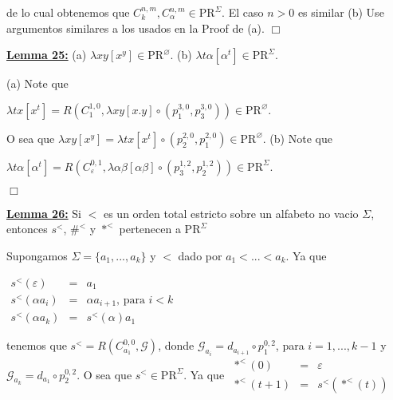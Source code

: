   de lo cual obtenemos que \(C_{k}^{n,m},C_{\alpha }^{n,m}\in \mathrm{PR} ^{\Sigma }\). El caso \(n >0\) es similar
  (b) Use argumentos similares a los usados en la Proof de (a). \(\Box\)


  \textbf{\underline{Lemma 25:}}
  (a) \(\lambda xy\left[ x^{y}\right] \in \mathrm{PR}^{\varnothing }\).
  (b) \(\lambda t\alpha \left[ \alpha ^{t}\right] \in \mathrm{PR} ^{\Sigma }\).


  \PROOF (a) Note que

  \(\displaystyle \lambda tx\left[ x^{t}\right] =R\left( C_{1}^{1,0},\lambda xy\left[ x.y \right] \circ \left( p_{1}^{3,0},p_{3}^{3,0}\right) \right) \in \mathrm{PR} ^{\varnothing }. \)

  O sea que \(\lambda xy\left[ x^{y}\right] =\lambda tx\left[ x^{t}\right] \circ \left( p_{2}^{2,0},p_{1}^{2,0}\right) \in \mathrm{PR}^{\varnothing }\).
  (b) Note que

  \(\displaystyle \lambda t\alpha \left[ \alpha ^{t}\right] =R\left( C_{\varepsilon }^{0,1},\lambda \alpha \beta \left[ \alpha \beta \right] \circ \left( p_{3}^{1,2},p_{2}^{1,2}\right) \right) \in \mathrm{PR}^{\Sigma }. \)

  \(\Box\)


  \textbf{\underline{Lemma 26:}} Si \(< \) es un orden total estricto sobre un alfabeto no vacio \( \Sigma \), entonces \(s^{< }\), \(\#^{< }\) y \(\ast ^{< }\) pertenecen a \(\mathrm{PR} ^{\Sigma }\)

  \PROOF Supongamos \(\Sigma =\{a_{1},...,a_{k}\}\) y \(< \) dado por \(a_{1}< ...< a_{k}\). Ya que

  \(\displaystyle \begin{array}{rcl} s^{< }(\varepsilon ) & =& a_{1} \\ s^{< }(\alpha a_{i}) & =& \alpha a_{i+1}\text{, para }i< k \\ s^{< }(\alpha a_{k}) & =& s^{< }(\alpha )a_{1} \end{array} \)

  tenemos que \(s^{< }=R\left( C_{a_{1}}^{0,0},\mathcal{G}\right) \), donde \( \mathcal{G}_{a_{i}}=d_{a_{i+1}}\circ p_{1}^{0,2}\), para \(i=1,...,k-1\) y \( \mathcal{G}_{a_{k}}=d_{a_{1}}\circ p_{2}^{0,2}.\) O sea que \(s^{< }\in \mathrm{ PR}^{\Sigma }.\) Ya que
  \(\displaystyle \begin{array}{rcl} \ast ^{< }(0) & =& \varepsilon \\ \ast ^{< }(t+1) & =& s^{< }(\ast ^{< }(t)) \end{array} \)

